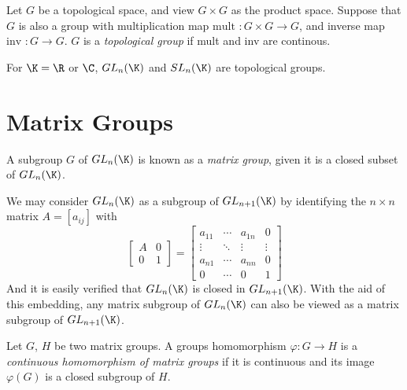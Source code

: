 \begin{definition}
  Let \(G\) be a topological space, and view \(G\times G\) as the product space. Suppose that
  \(G\) is also a group with multiplication map \(\text{mult }:G\times G\longrightarrow G\),
  and inverse map \(\text{inv }:G\longrightarrow G\). \(G\) is a {\it topological group} if
  mult and inv are continous.
\end{definition}

\begin{theorem}
  For \(\K=\R\) or \(\C\), \(GL_n(\K)\) and \(SL_n(\K)\) are topological groups.
\end{theorem}

\section{Matrix Groups}

\begin{definition}
  A subgroup \(G\) of \(GL_n(\K)\) is known as a {\it matrix group}, given
  it is a closed subset of \(GL_n(\K)\).
\end{definition}

\begin{remark}
  We may consider \(GL_n(\K)\) as a subgroup of \(GL_{n+1}(\K)\) by identifying the \(n\times n\)
  matrix \(A=[a_{ij}]\) with
  \[
    \left[\begin{array}{cc}
      A & 0 \\
      0 & 1
    \end{array}\right]
    =
    \left[\begin{array}{cccc}
      a_{11} & \cdots & a_{1n} & 0 \\
      \vdots & \ddots & \vdots & \vdots \\
      a_{n1} & \cdots & a_{nn} & 0 \\
      0 & \cdots & 0 & 1
    \end{array}\right]
  \]
  And it is easily verified that \(GL_n(\K)\) is closed in \(GL_{n+1}(\K)\). With the aid of this embedding, any matrix subgroup of \(GL_n(\K)\) can also be viewed as
  a matrix subgroup of \(GL_{n+1}(\K)\).
\end{remark}

\begin{definition}
  Let \(G\), \(H\) be two matrix groups. A groups homomorphism \(\varphi:G\longrightarrow H\) is a
  {\it continuous homomorphism of matrix groups} if it is continuous and its image
  \(\varphi(G)\) is a closed subgroup of \(H\).
\end{definition}

